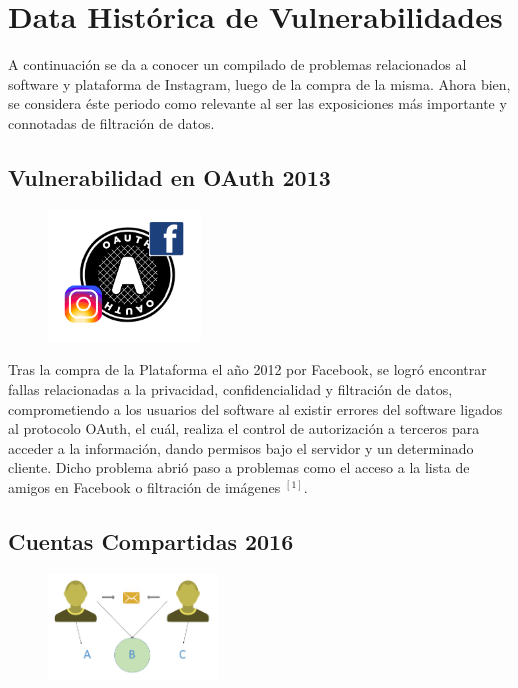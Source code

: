 \documentclass[a4paper,11pt]{article}
\theoremstyle{mytheor}
\begin{document}
\section{Data Histórica de Vulnerabilidades}

A continuación se da a conocer un compilado de problemas relacionados al software y plataforma de Instagram, luego de la compra de la misma. Ahora bien, se considera éste periodo como relevante al ser las exposiciones más importante y connotadas de filtración de datos. 

\subsection{Vulnerabilidad en OAuth 2013}


\begin{figure} 
\vspace{1pt}
  \begin{center}
    \includegraphics[width=0.36\textwidth]{oauth}
    \label{fig:databaseUserTable}
  \end{center}
  \vspace{1pt}
\end{figure} 

Tras la compra de la Plataforma el año 2012 por Facebook, se logró encontrar fallas relacionadas a la privacidad, confidencialidad y filtración de datos, comprometiendo a los usuarios del software al existir errores del software ligados al protocolo OAuth, el cuál, realiza el control de autorización a terceros para acceder a la información, dando permisos bajo el servidor y un determinado cliente. Dicho problema abrió paso a problemas como el acceso a la lista de amigos en Facebook o filtración de imágenes $^{[1]}$.


\subsection{Cuentas Compartidas 2016}

\begin{figure} 
\vspace{1pt}
  \begin{center}
    \includegraphics[width=0.4\textwidth]{compartidaig.png}
    \label{fig:databaseUserTable}
  \end{center}
  \vspace{2pt}
\end{figure} 
\end{document}
